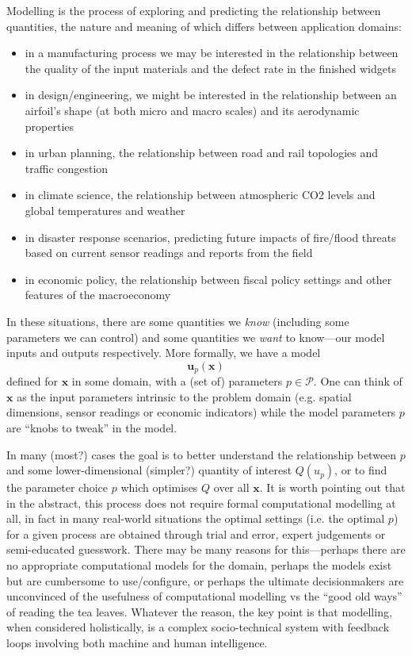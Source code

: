\documentclass[a4paper,fontsize=12pt]{scrartcl}
\begin{document}
Modelling is the process of exploring and predicting the relationship
between quantities, the nature and meaning of which differs between
application domains:
\begin{itemize}
\item in a manufacturing process we may be interested in the
  relationship between the quality of the input materials and the
  defect rate in the finished widgets
\item in design/engineering, we might be interested in the
  relationship between an airfoil's shape (at both micro and macro
  scales) and its aerodynamic properties
\item in urban planning, the relationship between road and rail
  topologies and traffic congestion
\item in climate science, the relationship between atmospheric CO2
  levels and global temperatures and weather
\item in disaster response scenarios, predicting future impacts of
  fire/flood threats based on current sensor readings and reports from
  the field
\item in economic policy, the relationship between fiscal policy
  settings and other features of the macroeconomy
\end{itemize}

In these situations, there are some quantities we \emph{know}
(including some parameters we can control) and some quantities we
\emph{want} to know---our model inputs and outputs
respectively. More formally, we have a model
\begin{equation}
  \label{eq:1}
  \mathbf{u}_p(\mathbf{x})
\end{equation}
defined for $\mathbf{x}$ in some domain, with a (set of) parameters
$p \in \mathcal{P}$. One can think of $\mathbf{x}$ as the input
parameters intrinsic to the problem domain (e.g. spatial dimensions,
sensor readings or economic indicators) while the model parameters $p$
are ``knobs to tweak'' in the model.

In many (most?) cases the goal is to better understand the
relationship between $p$ and some lower-dimensional (simpler?)
quantity of interest $Q(u_p)$, or to find the parameter choice $p$
which optimises $Q$ over all $\mathbf{x}$. It is worth pointing out
that in the abstract, this process does not require formal
computational modelling at all, in fact in many real-world situations
the optimal settings (i.e. the optimal $p$) for a given process are
obtained through trial and error, expert judgements or semi-educated
guesswork. There may be many reasons for this---perhaps there are no
appropriate computational models for the domain, perhaps the models
exist but are cumbersome to use/configure, or perhaps the ultimate
decisionmakers are unconvinced of the usefulness of computational
modelling vs the ``good old ways'' of reading the tea leaves. Whatever
the reason, the key point is that modelling, when considered
holistically, is a complex socio-technical system with feedback loops
involving both machine and human intelligence.
\end{document}
